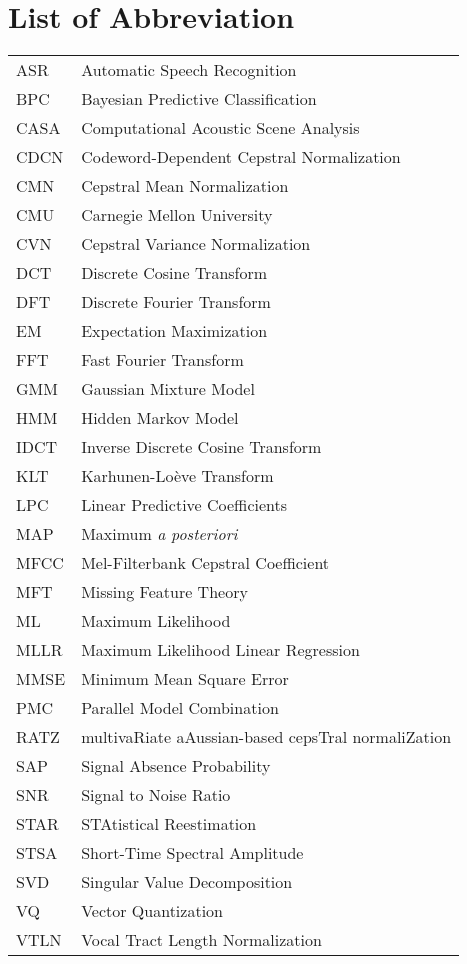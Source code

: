 \chapter* {List of Abbreviation}

\begin{tabular}{p{100pt}l}
    ASR & Automatic Speech Recognition \\
    BPC & Bayesian Predictive Classification\\
    CASA & Computational Acoustic Scene Analysis\\
    CDCN & Codeword-Dependent Cepstral Normalization\\
    CMN & Cepstral Mean Normalization\\
    CMU & Carnegie Mellon University\\
    CVN & Cepstral Variance Normalization\\
    DCT & Discrete Cosine Transform\\
    DFT & Discrete Fourier Transform\\
    EM & Expectation Maximization\\
    FFT & Fast Fourier Transform\\
    GMM & Gaussian Mixture Model\\
    HMM & Hidden Markov Model\\
    IDCT & Inverse Discrete Cosine Transform\\
    KLT & Karhunen-Lo\`{e}ve Transform\\
    LPC & Linear Predictive Coefficients\\
    MAP & Maximum \emph{a posteriori}\\
    MFCC & Mel-Filterbank Cepstral Coefficient\\
    MFT & Missing Feature Theory\\
    ML  & Maximum Likelihood\\
    MLLR & Maximum Likelihood Linear Regression\\
    MMSE & Minimum Mean Square Error\\
    PMC & Parallel Model Combination\\
    RATZ & multivaRiate aAussian-based cepsTral normaliZation\\
    SAP & Signal Absence Probability\\
    SNR & Signal to Noise Ratio\\
    STAR & STAtistical Reestimation\\
    STSA & Short-Time Spectral Amplitude\\
    SVD & Singular Value Decomposition\\
    VQ & Vector Quantization\\
    VTLN & Vocal Tract Length Normalization\\
\end{tabular}

